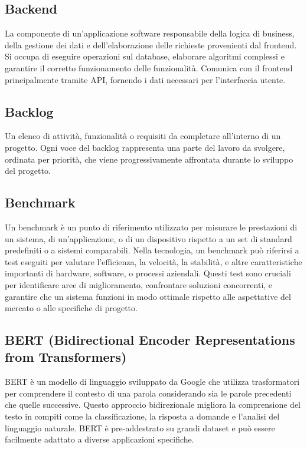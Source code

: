 \documentclass{article}
\begin{document}
\subsection{Backend}
La componente di un'applicazione software responsabile della logica di business, della gestione dei dati e dell'elaborazione delle richieste provenienti dal frontend. Si occupa di eseguire operazioni sul database, elaborare algoritmi complessi e garantire il corretto funzionamento delle funzionalità. Comunica con il frontend principalmente tramite API, fornendo i dati necessari per l'interfaccia utente.

\subsection{Backlog}
Un elenco di attività, funzionalità o requisiti da completare all'interno di un progetto. Ogni voce del backlog rappresenta una parte del lavoro da svolgere, ordinata per priorità, che viene progressivamente affrontata durante lo sviluppo del progetto.
 
\subsection{Benchmark}
Un benchmark è un punto di riferimento utilizzato per misurare le prestazioni di un sistema, di un'applicazione, o di un dispositivo rispetto a un set di standard predefiniti o a sistemi comparabili. Nella tecnologia, un benchmark può riferirsi a test eseguiti per valutare l'efficienza, la velocità, la stabilità, e altre caratteristiche importanti di hardware, software, o processi aziendali. Questi test sono cruciali per identificare aree di miglioramento, confrontare soluzioni concorrenti, e garantire che un sistema funzioni in modo ottimale rispetto alle aspettative del mercato o alle specifiche di progetto.

\subsection{BERT (Bidirectional Encoder Representations from Transformers)}
BERT è un modello di linguaggio sviluppato da Google che utilizza trasformatori per comprendere il contesto di una parola considerando sia le parole precedenti che quelle successive. Questo approccio bidirezionale migliora la comprensione del testo in compiti come la classificazione, la risposta a domande e l'analisi del linguaggio naturale. BERT è pre-addestrato su grandi dataset e può essere facilmente adattato a diverse applicazioni specifiche.
\end{document}
